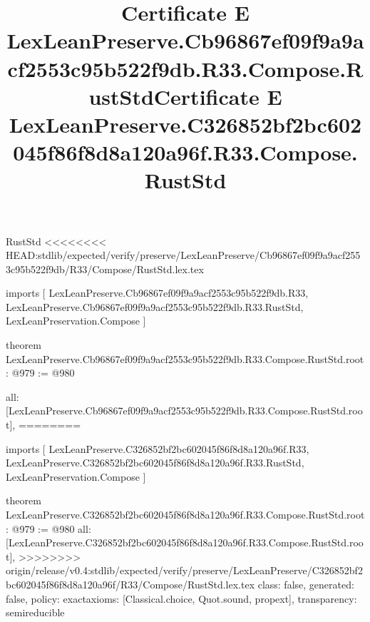 \begin{lexlean}{RustStd}
<<<<<<<< HEAD:stdlib/expected/verify/preserve/LexLeanPreserve/Cb96867ef09f9a9acf2553c95b522f9db/R33/Compose/RustStd.lex.tex
\title{Certificate E LexLeanPreserve.Cb96867ef09f9a9acf2553c95b522f9db.R33.Compose.RustStd}
\begin{coremodule}
imports [
  LexLeanPreserve.Cb96867ef09f9a9acf2553c95b522f9db.R33,
  LexLeanPreserve.Cb96867ef09f9a9acf2553c95b522f9db.R33.RustStd,
  LexLeanPreservation.Compose
]

theorem LexLeanPreserve.Cb96867ef09f9a9acf2553c95b522f9db.R33.Compose.RustStd.root : @979 := @980 {
  all: [LexLeanPreserve.Cb96867ef09f9a9acf2553c95b522f9db.R33.Compose.RustStd.root],
========
\title{Certificate E LexLeanPreserve.C326852bf2bc602045f86f8d8a120a96f.R33.Compose.RustStd}
\begin{coremodule}
imports [
  LexLeanPreserve.C326852bf2bc602045f86f8d8a120a96f.R33,
  LexLeanPreserve.C326852bf2bc602045f86f8d8a120a96f.R33.RustStd,
  LexLeanPreservation.Compose
]

theorem LexLeanPreserve.C326852bf2bc602045f86f8d8a120a96f.R33.Compose.RustStd.root : @979 := @980 {
  all: [LexLeanPreserve.C326852bf2bc602045f86f8d8a120a96f.R33.Compose.RustStd.root],
>>>>>>>> origin/release/v0.4:stdlib/expected/verify/preserve/LexLeanPreserve/C326852bf2bc602045f86f8d8a120a96f/R33/Compose/RustStd.lex.tex
  class: false,
  generated: false,
  policy: exact{axioms: [Classical.choice, Quot.sound, propext]},
  transparency: semireducible
}


\end{coremodule}}
\end{coremodule}
\end{lexlean}
